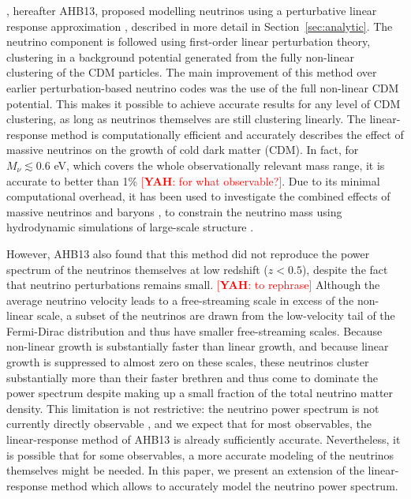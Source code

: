 \documentclass[useAMS, usenatbib]{mnras}
\newcommand{\yah}[1]{{\textcolor{red}{[{\bf YAH}: #1]}}}
\begin{document}
\cite{AHB}, hereafter AHB13, proposed modelling neutrinos using a perturbative linear response approximation \citep{Bond_1980, Ma_1994}, described in more detail in Section~\ref{sec:analytic}. The neutrino component is followed using first-order linear perturbation theory, clustering in a background potential generated from the fully non-linear clustering of the CDM particles. The main improvement of this method over earlier perturbation-based neutrino codes \citep{Brandbyge_2009} was the use of the full non-linear CDM potential. This makes it possible to achieve accurate results for any level of CDM clustering, as long as neutrinos themselves are still clustering linearly.
The linear-response method is computationally efficient and accurately describes the effect of massive neutrinos on the growth of cold dark matter (CDM).
In fact, for $M_\nu \lesssim 0.6$ eV, which covers the whole observationally relevant mass range, it is accurate to better than 1\% \yah{for what observable?}. Due to its minimal computational overhead,
it has been used to investigate the combined effects of massive neutrinos and baryons \citep{Mummery_2017}, to constrain
the neutrino mass using hydrodynamic simulations of large-scale structure \citep{McCarthy_2017, McCarthy_2018}.

However, AHB13 also found that this method did not reproduce the power spectrum of the neutrinos themselves at low redshift ($z < 0.5$), despite the fact that neutrino perturbations remains small. 
\yah{to rephrase}
Although the average neutrino velocity leads to a free-streaming scale in excess of the non-linear scale, a subset of the neutrinos are drawn from the low-velocity tail of the Fermi-Dirac distribution and thus have smaller free-streaming scales. Because non-linear growth is substantially faster than linear growth, and because linear growth is suppressed to almost zero on these scales, these neutrinos cluster substantially more than their faster brethren and thus come to dominate the power spectrum despite making up a small fraction of the total neutrino matter density.
This limitation is not restrictive: the neutrino power spectrum is not currently directly observable \citep[but see][]{Ptolemy}, and we expect that for most observables, the linear-response method of AHB13 is already sufficiently accurate. Nevertheless, it is possible that for some observables, a more accurate modeling of the neutrinos themselves might be needed. In this paper, we present an extension of the linear-response method which allows to accurately model the neutrino power spectrum. 
\end{document}
